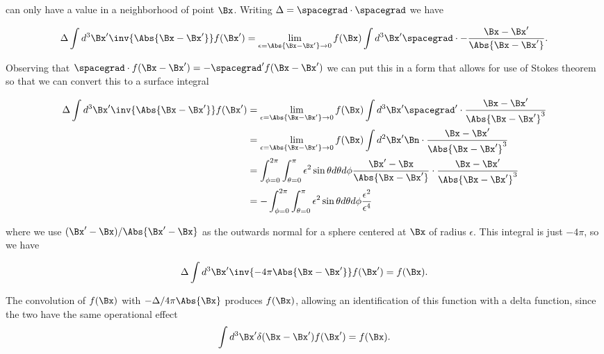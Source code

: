 can only have a value in a neighborhood of point \(\Bx\).  Writing \(\Delta = \spacegrad \cdot \spacegrad\) we have

\begin{equation}\label{eqn:relativisticElectrodynamicsL18:320}
\Delta \int d^3 \Bx' \inv{\Abs{\Bx - \Bx'} } f(\Bx') 
=
\lim_{\epsilon = \Abs{\Bx -\Bx'} \rightarrow 0}
f(\Bx) \int d^3 \Bx' \spacegrad \cdot -\frac{\Bx - \Bx'}{\Abs{\Bx - \Bx'}}.
\end{equation}

Observing that \(\spacegrad \cdot f(\Bx -\Bx') = -\spacegrad' f(\Bx - \Bx')\) we can put this in a form that allows for use of Stokes theorem so that we can convert this to a surface integral

\begin{equation}\label{eqn:relativisticElectrodynamicsL18:820}
\begin{aligned}
\Delta \int d^3 \Bx' \inv{\Abs{\Bx - \Bx'} } f(\Bx') 
&=
\lim_{\epsilon = \Abs{\Bx -\Bx'} \rightarrow 0}
f(\Bx) \int d^3 \Bx' \spacegrad' \cdot \frac{\Bx - \Bx'}{\Abs{\Bx - \Bx'}^3} \\
&=
\lim_{\epsilon = \Abs{\Bx -\Bx'} \rightarrow 0}
f(\Bx) \int d^2 \Bx' \Bn \cdot \frac{\Bx - \Bx'}{\Abs{\Bx - \Bx'}^3} \\
&= \int_{\phi=0}^{2\pi} \int_{\theta = 0}^\pi \epsilon^2 \sin\theta d\theta d\phi 
\frac{\Bx' - \Bx}{\Abs{\Bx - \Bx'}} \cdot \frac{\Bx - \Bx'}{\Abs{\Bx - \Bx'}^3} \\
&= -\int_{\phi=0}^{2\pi} \int_{\theta = 0}^\pi \epsilon^2 \sin\theta d\theta d\phi \frac{\epsilon^2}{\epsilon^4}
\end{aligned}
\end{equation}

where we use \((\Bx' - \Bx)/\Abs{\Bx' - \Bx}\) as the outwards normal for a sphere centered at \(\Bx\) of radius \(\epsilon\).  This integral is just \(-4 \pi\), so we have

\begin{equation}\label{eqn:relativisticElectrodynamicsL18:360}
\Delta \int d^3 \Bx' \inv{-4 \pi \Abs{\Bx - \Bx'} } f(\Bx') 
=
f(\Bx).
\end{equation}

The convolution of \(f(\Bx)\) with \(-\Delta/4 \pi \Abs{\Bx}\) produces \(f(\Bx)\), allowing an identification of this function with a delta function, since the two have the same operational effect
\begin{equation}\label{eqn:relativisticElectrodynamicsL18:380}
\int d^3 \Bx' \delta(\Bx - \Bx') f(\Bx') 
=
f(\Bx).
\end{equation}

